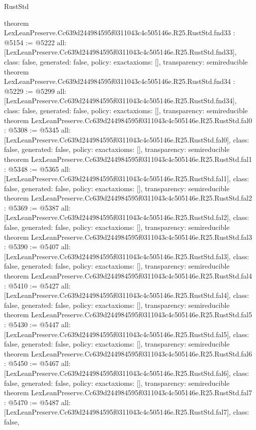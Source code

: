 \begin{lexlean}{RustStd}
\begin{coremodule}
{}
theorem LexLeanPreserve.Cc639d244984595f0311043c4c505146e.R25.RustStd.fnd33 : @5154 := @5222 {
  all: [LexLeanPreserve.Cc639d244984595f0311043c4c505146e.R25.RustStd.fnd33],
  class: false,
  generated: false,
  policy: exact{axioms: []},
  transparency: semireducible
}
theorem LexLeanPreserve.Cc639d244984595f0311043c4c505146e.R25.RustStd.fnd34 : @5229 := @5299 {
  all: [LexLeanPreserve.Cc639d244984595f0311043c4c505146e.R25.RustStd.fnd34],
  class: false,
  generated: false,
  policy: exact{axioms: []},
  transparency: semireducible
}
theorem LexLeanPreserve.Cc639d244984595f0311043c4c505146e.R25.RustStd.fal0 : @5308 := @5345 {
  all: [LexLeanPreserve.Cc639d244984595f0311043c4c505146e.R25.RustStd.fal0],
  class: false,
  generated: false,
  policy: exact{axioms: []},
  transparency: semireducible
}
theorem LexLeanPreserve.Cc639d244984595f0311043c4c505146e.R25.RustStd.fal1 : @5348 := @5365 {
  all: [LexLeanPreserve.Cc639d244984595f0311043c4c505146e.R25.RustStd.fal1],
  class: false,
  generated: false,
  policy: exact{axioms: []},
  transparency: semireducible
}
theorem LexLeanPreserve.Cc639d244984595f0311043c4c505146e.R25.RustStd.fal2 : @5369 := @5387 {
  all: [LexLeanPreserve.Cc639d244984595f0311043c4c505146e.R25.RustStd.fal2],
  class: false,
  generated: false,
  policy: exact{axioms: []},
  transparency: semireducible
}
theorem LexLeanPreserve.Cc639d244984595f0311043c4c505146e.R25.RustStd.fal3 : @5390 := @5407 {
  all: [LexLeanPreserve.Cc639d244984595f0311043c4c505146e.R25.RustStd.fal3],
  class: false,
  generated: false,
  policy: exact{axioms: []},
  transparency: semireducible
}
theorem LexLeanPreserve.Cc639d244984595f0311043c4c505146e.R25.RustStd.fal4 : @5410 := @5427 {
  all: [LexLeanPreserve.Cc639d244984595f0311043c4c505146e.R25.RustStd.fal4],
  class: false,
  generated: false,
  policy: exact{axioms: []},
  transparency: semireducible
}
theorem LexLeanPreserve.Cc639d244984595f0311043c4c505146e.R25.RustStd.fal5 : @5430 := @5447 {
  all: [LexLeanPreserve.Cc639d244984595f0311043c4c505146e.R25.RustStd.fal5],
  class: false,
  generated: false,
  policy: exact{axioms: []},
  transparency: semireducible
}
theorem LexLeanPreserve.Cc639d244984595f0311043c4c505146e.R25.RustStd.fal6 : @5450 := @5467 {
  all: [LexLeanPreserve.Cc639d244984595f0311043c4c505146e.R25.RustStd.fal6],
  class: false,
  generated: false,
  policy: exact{axioms: []},
  transparency: semireducible
}
theorem LexLeanPreserve.Cc639d244984595f0311043c4c505146e.R25.RustStd.fal7 : @5470 := @5487 {
  all: [LexLeanPreserve.Cc639d244984595f0311043c4c505146e.R25.RustStd.fal7],
  class: false,
}
\end{coremodule}
\end{lexlean}
